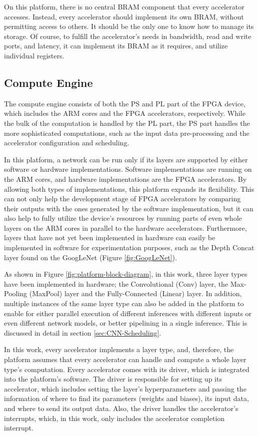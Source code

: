 On this platform, there is no central BRAM component that every accelerator accesses. Instead, every accelerator should implement its own BRAM, without permitting access to others. It should be the only one to know how to manage its storage. Of course, to fulfill the accelerator's needs in bandwidth, read and write ports, and latency, it can implement its BRAM as it requires, and utilize individual registers.

\subsection{Compute Engine}
The compute engine consists of both the PS and PL part of the FPGA device, which includes the ARM cores and the FPGA accelerators, respectively. While the bulk of the computation is handled by the PL part, the PS part handles the more sophisticated computations, such as the input data pre-processing and the accelerator configuration and scheduling.

In this platform, a network can be run only if its layers are supported by either software or hardware implementations. Software implementations are running on the ARM cores, and hardware implementations are the FPGA accelerators. By allowing both types of implementations, this platform expands its flexibility. This can not only help the development stage of FPGA accelerators by comparing their outputs with the ones generated by the software implementation, but it can also help to fully utilize the device's resources by running parts of even whole layers on the ARM cores in parallel to the hardware accelerators. Furthermore, layers that have not yet been implemented in hardware can easily be implemented in software for experimentation purposes, such as the Depth Concat layer found on the GoogLeNet (Figure \ref{fig:GoogLeNet}).

As shown in Figure \ref{fig:platform-block-diagram}, in this work, three layer types have been implemented in hardware; the Convolutional (Conv) layer, the Max-Pooling (MaxPool) layer and the Fully-Connected (Linear) layer. In addition, multiple instances of the same layer type can also be added in the platform to enable for either parallel execution of different inferences with different inputs or even different network models, or better pipelining in a single inference. This is discussed in detail in section \ref{sec:CNN-Scheduling}.

In this work, every accelerator implements a layer type, and, therefore, the platform assumes that every accelerator can handle and compute a whole layer type's computation. Every accelerator comes with its driver, which is integrated into the platform's software. The driver is responsible for setting up its accelerator, which includes setting the layer's hyperparameters and passing the information of where to find its parameters (weights and biases), its input data, and where to send its output data. Also, the driver handles the accelerator's interrupts, which,  in this work, only includes the accelerator completion interrupt.

